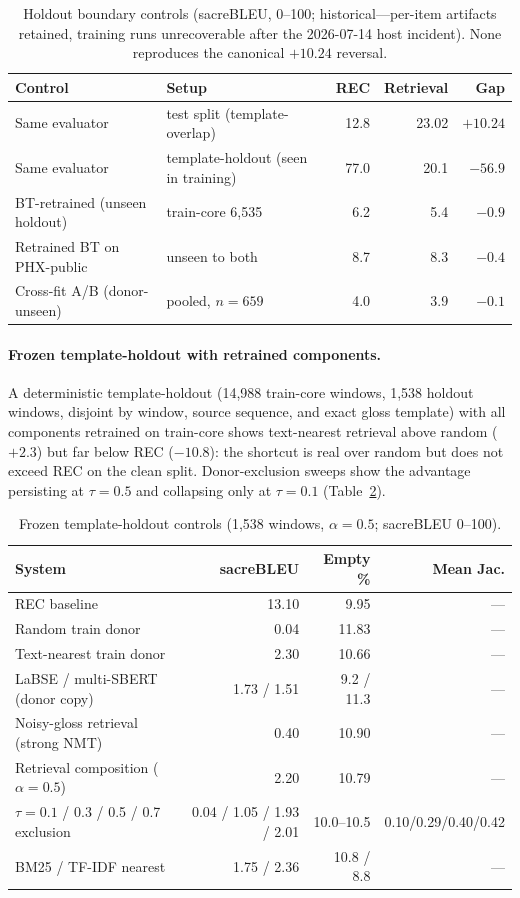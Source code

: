 \documentclass[pdflatex,sn-chicago]{sn-jnl}
\begin{document}
\begin{table}[h]
\centering
\scriptsize
\caption{Holdout boundary controls (sacreBLEU, 0--100; historical---per-item artifacts retained, training runs unrecoverable after the 2026-07-14 host incident). None reproduces the canonical $+10.24$ reversal.}
\label{tab:holdout_series}
\begin{tabular}{llrrr}
\toprule
Control & Setup & REC & Retrieval & Gap \\
\midrule
Same evaluator & test split (template-overlap) & 12.8 & 23.02 & $+10.24$ \\
Same evaluator & template-holdout (seen in training) & 77.0 & 20.1 & $-56.9$ \\
BT-retrained (unseen holdout) & train-core 6{,}535 & 6.2 & 5.4 & $-0.9$ \\
Retrained BT on PHX-public & unseen to both & 8.7 & 8.3 & $-0.4$ \\
Cross-fit A/B (donor-unseen) & pooled, $n{=}659$ & 4.0 & 3.9 & $-0.1$ \\
\bottomrule
\end{tabular}
\end{table}

\paragraph{Frozen template-holdout with retrained components.}
A deterministic template-holdout (14{,}988 train-core windows, 1{,}538 holdout windows, disjoint by window, source sequence, and exact gloss template) with all components retrained on train-core shows text-nearest retrieval above random ($+2.3$) but far below REC ($-10.8$): the shortcut is real over random but does not exceed REC on the clean split. Donor-exclusion sweeps show the advantage persisting at $\tau{=}0.5$ and collapsing only at $\tau{=}0.1$ (Table~\ref{tab:holdout_controls}).

\begin{table}[h]
\centering
\scriptsize
\caption{Frozen template-holdout controls (1,538 windows, $\alpha{=}0.5$; sacreBLEU 0--100).}
\label{tab:holdout_controls}
\begin{tabular}{lrrr}
\toprule
System & sacreBLEU & Empty \% & Mean Jac. \\
\midrule
REC baseline & 13.10 & 9.95 & --- \\
Random train donor & 0.04 & 11.83 & --- \\
Text-nearest train donor & 2.30 & 10.66 & --- \\
LaBSE / multi-SBERT (donor copy) & 1.73 / 1.51 & 9.2 / 11.3 & --- \\
Noisy-gloss retrieval (strong NMT) & 0.40 & 10.90 & --- \\
Retrieval composition ($\alpha{=}0.5$) & 2.20 & 10.79 & --- \\
\midrule
$\tau{=}0.1$ / 0.3 / 0.5 / 0.7 exclusion & 0.04 / 1.05 / 1.93 / 2.01 & 10.0--10.5 & 0.10/0.29/0.40/0.42 \\
BM25 / TF-IDF nearest & 1.75 / 2.36 & 10.8 / 8.8 & --- \\
\bottomrule
\end{tabular}
\end{table}
\end{document}
